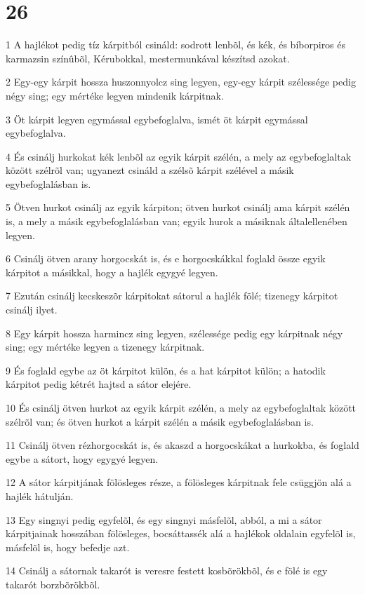 \chapter{26}

\par 1 A hajlékot pedig tíz kárpitból csináld: sodrott lenbõl, és kék, és bíborpiros és karmazsin színûbõl, Kérubokkal, mestermunkával készítsd azokat.
\par 2 Egy-egy kárpit hossza huszonnyolcz sing legyen, egy-egy kárpit szélessége pedig négy sing; egy mértéke legyen mindenik kárpitnak.
\par 3 Öt kárpit legyen egymással egybefoglalva, ismét öt kárpit egymással egybefoglalva.
\par 4 És csinálj hurkokat kék lenbõl az egyik kárpit szélén, a mely az egybefoglaltak között szélrõl van; ugyanezt csináld a szélsõ kárpit szélével a másik egybefoglalásban is.
\par 5 Ötven hurkot csinálj az egyik kárpiton; ötven hurkot csinálj ama kárpit szélén is, a mely a másik egybefoglalásban van; egyik hurok a másiknak általellenében legyen.
\par 6 Csinálj ötven arany horgocskát is, és e horgocskákkal foglald össze egyik kárpitot a másikkal, hogy a hajlék egygyé legyen.
\par 7 Ezután csinálj kecskeszõr kárpitokat sátorul a hajlék fölé; tizenegy kárpitot csinálj ilyet.
\par 8 Egy kárpit hossza harmincz sing legyen, szélessége pedig egy kárpitnak négy sing; egy mértéke legyen a tizenegy kárpitnak.
\par 9 És foglald egybe az öt kárpitot külön, és a hat kárpitot külön; a hatodik kárpitot pedig kétrét hajtsd a sátor elejére.
\par 10 És csinálj ötven hurkot az egyik kárpit szélén, a mely az egybefoglaltak között szélrõl van; és ötven hurkot a kárpit szélén a másik egybefoglalásban is.
\par 11 Csinálj ötven rézhorgocskát is, és akaszd a horgocskákat a hurkokba, és foglald egybe a sátort, hogy egygyé legyen.
\par 12 A sátor kárpitjának fölösleges része, a fölösleges kárpitnak fele csüggjön alá a hajlék hátulján.
\par 13 Egy singnyi pedig egyfelõl, és egy singnyi másfelõl, abból, a mi a sátor kárpitjainak hosszában fölösleges, bocsáttassék alá a hajlékok oldalain egyfelõl is, másfelõl is, hogy befedje azt.
\par 14 Csinálj a sátornak takarót is veresre festett kosbõrökbõl, és e fölé is egy takarót borzbõrökbõl.

